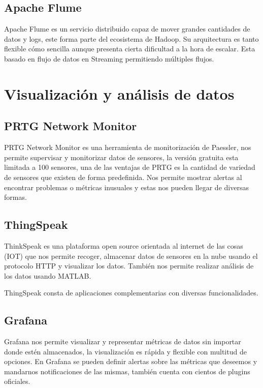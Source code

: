 \subsection{Apache Flume}

Apache Flume es un servicio distribuido capaz de mover grandes cantidades de datos y logs, este forma parte del ecosistema de Hadoop. Su arquitectura es tanto flexible cómo sencilla aunque presenta cierta dificultad a la hora de escalar. Esta basado en flujo de datos en Streaming permitiendo múltiples flujos. 

\section{Visualización y análisis de datos}

\subsection{PRTG Network Monitor}

PRTG Network Monitor es una herramienta de monitorización de Paessler, nos permite supervisar y monitorizar datos de sensores,  la versión gratuita esta limitada a 100 sensores, una de las ventajas de PRTG es la cantidad de variedad de sensores que existen de forma predefinida. Nos permite mostrar alertas al encontrar problemas o métricas inusuales y estas nos pueden llegar de diversas formas.

\subsection{ThingSpeak}

ThinkSpeak es una plataforma open source orientada al internet de las cosas (IOT) que nos permite recoger, almacenar datos de sensores en la nube usando el protocolo HTTP y visualizar los datos. También nos permite realizar análisis de los datos usando MATLAB. 

ThingSpeak consta de aplicaciones complementarias con diversas funcionalidades.

\subsection{Grafana}

Grafana nos permite visualizar y representar métricas de datos sin importar donde estén almacenados, la visualización es rápida y flexible con multitud de opciones. En Grafana se pueden definir alertas sobre las métricas que deseemos y mandarnos notificaciones de las mismas, también cuenta con cientos de plugins oficiales. 

